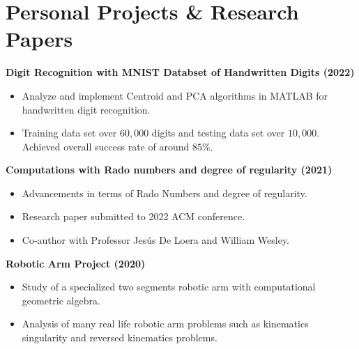 \section{\sc Personal Projects \& Research Papers}

{\bf{Digit Recognition with MNIST Databset of Handwritten Digits} (2022)}\\
\begin{itemize}
\setlength\itemsep{0em}
\item Analyze and implement Centroid and PCA algorithms in MATLAB for handwritten digit recognition. 
\item Training data set over $60,000$ digits and testing data set over $10,000$. Achieved overall success rate of around $85\%$.
\end{itemize}

{\bf{Computations with Rado numbers and degree of regularity} (2021)}\\
\begin{itemize}
\setlength\itemsep{0em}
\item Advancements in terms of Rado Numbers and degree of regularity.
\item Research paper submitted to 2022 ACM conference.
\item Co-author with Professor Jes\'{u}s De Loera and William Wesley.
\end{itemize}


{\bf{Robotic Arm Project} (2020)}\\
\begin{itemize}
\setlength\itemsep{0em}
\item Study of a specialized two segments robotic arm with computational geometric algebra.
\item Analysis of many real life robotic arm problems such as kinematics singularity and reversed kinematics problems. 
\end{itemize}




